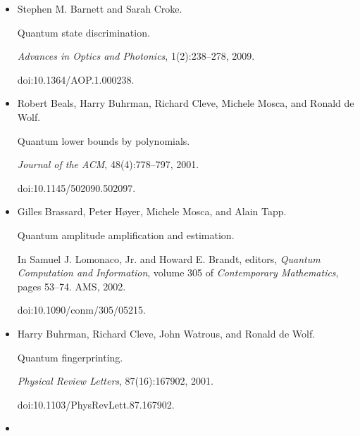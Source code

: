 \documentclass[10pt,a4paper]{article}
\begin{document}
\begin{itemize}
Stabilization of quantum computations by symmetrization.


\emph{SIAM Journal on Computing}, 26(5):1541–1557, 1997.


doi:10.1137/S0097539796302452.





\item[] 
[6]

Stephen M. Barnett and Sarah Croke.


Quantum state discrimination.


\emph{Advances in Optics and Photonics}, 1(2):238–278, 2009.


doi:10.1364/AOP.1.000238.





\item[] 
[7]

Robert Beals, Harry Buhrman, Richard Cleve, Michele Mosca, and Ronald de Wolf.


Quantum lower bounds by polynomials.


\emph{Journal of the ACM}, 48(4):778–797, 2001.


doi:10.1145/502090.502097.





\item[] 
[8]

Gilles Brassard, Peter Høyer, Michele Mosca, and Alain Tapp.


Quantum amplitude amplification and estimation.


In Samuel J. Lomonaco, Jr. and Howard E. Brandt, editors, \emph{Quantum Computation and Information}, volume 305 of \emph{Contemporary
Mathematics}, pages 53–74. AMS, 2002.


doi:10.1090/conm/305/05215.





\item[] 
[9]

Harry Buhrman, Richard Cleve, John Watrous, and Ronald de Wolf.


Quantum fingerprinting.


\emph{Physical Review Letters}, 87(16):167902, 2001.


doi:10.1103/PhysRevLett.87.167902.





\item[] 
[10]


\end{itemize}
\end{document}
